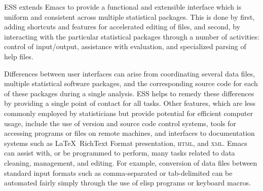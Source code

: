 \documentclass{article}
\newcommand{\stexttt}[1]{{\small\texttt{#1}}}
\begin{document}
ESS extends Emacs to provide a functional and extensible interface
which is uniform and consistent across multiple statistical packages.
This is done by first, adding shortcuts and features for accelerated
editing of files, and second, by interacting with the particular
statistical packages through a number of activities: control of
input/output, assistance with evaluation, and specialized parsing of
help files.

Differences between user interfaces can arise from coordinating
several data files, multiple statistical software packages, and the
corresponding source code for each of these packages during a single
analysis.  ESS helps to remedy these differences by providing a single
point of contact for all tasks.  Other features, which are less
commonly employed by statisticians but provide potential for efficient
computer usage, include the use of version and source code control
systems, tools for accessing programs or files on remote machines, and
interfaces to documentation systems such as \LaTeX\, RichText Format
presentation, \textsc{html}, and \textsc{xml}.  Emacs can assist with,
or be programmed to perform, many tasks related to data cleaning,
management, and editing.  For example, conversion of data files
between standard input formats such as comma-separated or
tab-delimited can be automated fairly simply through the use of elisp
programs or keyboard macros.




\end{document}
